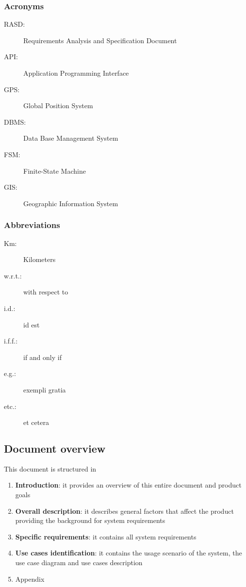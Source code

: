 \subsubsection{Acronyms}
	\begin{description}
		\item [RASD:] Requirements Analysis and Specification Document
		\item [API:] Application Programming Interface
		\item [GPS:] Global Position System
		\item [DBMS:] Data Base Management System
		\item [FSM:] Finite-State Machine
		\item [GIS:] Geographic Information System
	\end{description}
\subsubsection{Abbreviations}
	\begin{description}
		\item [Km:] Kilometers
		\item [w.r.t.:] with respect to
		\item [i.d.:] id est
		\item [i.f.f.:] if and only if
		\item [e.g.:] exempli gratia
		\item [etc.:] et cetera
	\end{description}

\subsection{Document overview}
This document is structured in 
\begin{enumerate}
	\item \textbf{Introduction}: it provides an overview of this entire document and product goals
	\item \textbf{Overall description}: it describes general factors that affect the product providing the background for system requirements
	\item \textbf{Specific requirements}: it contains all system requirements
	\item \textbf{Use cases identification}: it contains the usage scenario of the system, the use case diagram and use cases description
	\item Appendix
\end{enumerate}